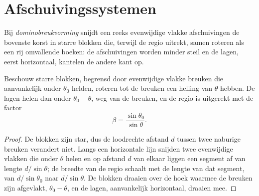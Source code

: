 \begin{omfigure}
\par{}\label{fig:b3:extension-strike-slip:models}
\end{omfigure}

\section{Afschuivingssystemen}\label{sec:b3:extension-strike-slip:faults}

\begin{definition}[Dominobreukvorming]\label{def:b3:extension-strike-slip:domino}
Bij \emph{dominobreukvorming} snijdt een reeks evenwijdige vlakke
afschuivingen de bovenste korst in starre blokken die, terwijl de regio uitrekt,
samen roteren als een rij omvallende boeken: de afschuivingen worden
minder steil en de lagen, eerst horizontaal, kantelen de andere kant op.
\end{definition}

\begin{theorem}\label{thm:b3:extension-strike-slip:domino}
Beschouw starre blokken, begrensd door evenwijdige vlakke breuken die aanvankelijk
onder $\theta_0$ helden, roteren tot de breuken een helling van $\theta$ hebben. De lagen helen dan onder $\theta_0
- \theta$, weg van de breuken, en de regio is uitgerekt met de
factor
\[
  \beta = \frac{\sin\theta_0}{\sin\theta} .
\]
\end{theorem}

\begin{proof}
De blokken zijn star, dus de loodrechte afstand $d$ tussen twee
naburige breuken verandert niet. Langs een horizontale lijn snijden twee evenwijdige
vlakken die onder $\theta$ helen en op afstand $d$ van elkaar liggen een segment af van lengte $d/\sin
\theta$; de breedte van de regio schaalt met de lengte van dat segment, van
$d/\sin\theta_0$ naar $d/\sin\theta$. De blokken draaien over de hoek waarmee
de breuken zijn afgevlakt, $\theta_0 - \theta$, en de lagen,
aanvankelijk horizontaal, draaien mee.
\end{proof}

